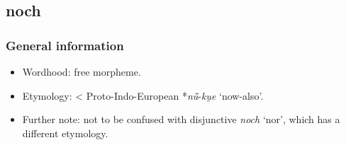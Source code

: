\subsection{noch}

\subsubsection{General information}
\begin{itemize}
	\item Wordhood: free morpheme.
	\item Etymology: < Proto-Indo-European *\textit{nū̌}-\textit{ku̯e} \lq now-also'.
	\item Further note: not to be confused with disjunctive \textit{noch} \lq nor', which has a different etymology.
\end{itemize}


